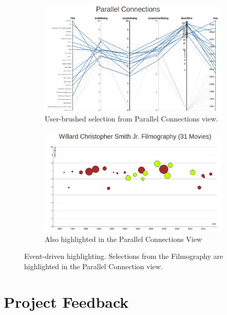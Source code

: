 \documentclass[12pt]{article}
\begin{document}
	\begin{figure}[h!]
		\centering
		\begin{subfigure}[t]{.5\textwidth}
		  \centering
		  \includegraphics[width=\linewidth]{images/pacScrub.png}
		  \caption{User-brushed selection from Parallel Connections view.}
		  \label{fig:ptfha}
		\end{subfigure}%
		\begin{subfigure}[t]{.6\textwidth}
		  \centering
		  \includegraphics[width=\linewidth]{images/TimelinePacHighlight.png}
		  \caption{Also highlighted in the Parallel Connections View}
		  \label{fig:ptfhb}
		\end{subfigure}%
		\caption{Event-driven highlighting.  Selections from the Filmography are highlighted in the Parallel Connection view.}
		\label{fig:parallelToFilmHighlight}
	\end{figure}
	
	
\newpage

\section{Project Feedback} \label{sec:Projcet Feedback}
\end{document}
